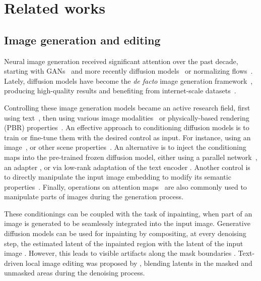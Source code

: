 
\section{Related works}

\subsection{Image generation and editing}
Neural image generation received significant attention over the past decade, starting with GANs~\cite{goodfellow2014gans,Karras2019stylegan2} and more recently diffusion models~\cite{sohl2015deep,rombach2021highresolution,podell2023sdxl,flux.1} or normalizing flows~\cite{zhang2021diffusionflow,esser2024sd3}. Lately, diffusion models have become the \textit{de facto} image generation framework~\cite{podell2023sdxl,peebles2023dit,ramesh2022dalle2,betker2023dalle3}, producing high-quality results and benefiting from internet-scale datasets~\cite{schuhmann2022laionb}. 

Controlling these image generation models became an active research field, first using text~\cite{ho2021classifier,meng2022sdedit}, then using various image modalities~\cite{zhang2023controlnet} or physically-based rendering (PBR) properties~\cite{zeng2024rgbx}. An effective approach to conditioning diffusion models is to train or fine-tune them with the desired control as input. For instance, using an image~\cite{ke2023marigold,he2024lotus,liu2024hyperhuman}, or other scene properties~\cite{zeng2024rgbx}. 
An alternative is to inject the conditioning maps into the pre-trained frozen diffusion model, either using a parallel network~\cite{zhang2023controlnet}, an adapter \cite{ye2023ipadapter}, or via low-rank adaptation of the text encoder \cite{lopes2024material}. 
Another control is to directly manipulate the input image embedding to modify its semantic properties~\cite{guerrero2024texsliders}. Finally, operations on attention maps~\cite{hertz2022prompt,epstein2023diffusion,parmar2023zero} are also commonly used to manipulate parts of images during the generation process. 

These conditionings can be coupled with the task of inpainting, when part of an image is generated to be seamlessly integrated into the input image. Generative diffusion models can be used for inpainting by compositing, at every denoising step, the estimated latent of the inpainted region with the latent of the input image \cite{lugmayr2022repaint}. However, this leads to visible artifacts along the mask boundaries \cite{cheng2024zest}. 
Text-driven local image editing was proposed by \citet{avrahami2023blended}, blending latents in the masked and unmasked areas during the denoising process. 

